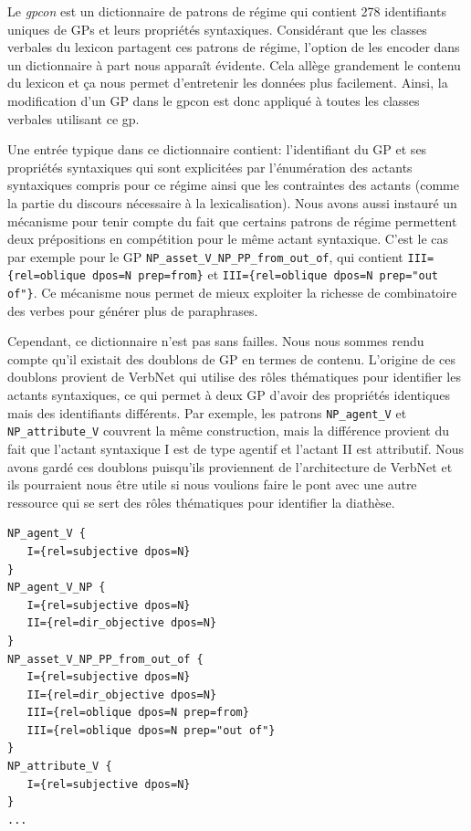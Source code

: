 Le \emph{gpcon} est un dictionnaire de patrons de régime qui contient 278 identifiants uniques de \acp{GP} et leurs propriétés syntaxiques. Considérant que les classes verbales du lexicon partagent ces patrons de régime, l'option de les encoder dans un dictionnaire à part nous apparaît évidente. Cela allège grandement le contenu du lexicon et ça nous permet d'entretenir les données plus facilement. Ainsi, la modification d'un \ac{GP} dans le gpcon est donc appliqué à toutes les classes verbales utilisant ce gp. 

Une entrée typique dans ce dictionnaire contient: l'identifiant du \ac{GP} et ses propriétés syntaxiques qui sont explicitées par l'énumération des actants syntaxiques compris pour ce régime ainsi que les contraintes des actants (comme la partie du discours nécessaire à la lexicalisation). Nous avons aussi instauré un mécanisme pour tenir compte du fait que certains patrons de régime permettent deux prépositions en compétition pour le même actant syntaxique. C'est le cas par exemple pour le \ac{GP} \texttt{NP\_asset\_V\_NP\_PP\_from\_out\_of}, qui contient \lstinline|III={rel=oblique dpos=N prep=from}| et \lstinline|III={rel=oblique dpos=N prep="out of"}|. Ce mécanisme nous permet de mieux exploiter la richesse de combinatoire des verbes pour générer plus de paraphrases.

Cependant, ce dictionnaire n'est pas sans failles. Nous nous sommes rendu compte qu'il existait des doublons de \ac{GP} en termes de contenu. L'origine de ces doublons provient de VerbNet qui utilise des rôles thématiques pour identifier les actants syntaxiques, ce qui permet à deux \ac{GP} d'avoir des propriétés identiques mais des identifiants différents. Par exemple, les patrons \texttt{NP\_agent\_V} et \texttt{NP\_attribute\_V} couvrent la même construction, mais la différence provient du fait que l'actant syntaxique I est de type agentif et l'actant II est attributif. Nous avons gardé ces doublons puisqu'ils proviennent de l'architecture de VerbNet et ils pourraient nous être utile si nous voulions faire le pont avec une autre ressource qui se sert des rôles thématiques pour identifier la diathèse.

\begin{lstlisting}[language=mate, caption = Extrait du \emph{gpcon}, label=fig:4entries-gpcon]
NP_agent_V {
   I={rel=subjective dpos=N}
}
NP_agent_V_NP {
   I={rel=subjective dpos=N}
   II={rel=dir_objective dpos=N}
}
NP_asset_V_NP_PP_from_out_of {
   I={rel=subjective dpos=N}
   II={rel=dir_objective dpos=N}
   III={rel=oblique dpos=N prep=from}
   III={rel=oblique dpos=N prep="out of"}
}
NP_attribute_V {
   I={rel=subjective dpos=N}
}
...
\end{lstlisting}

